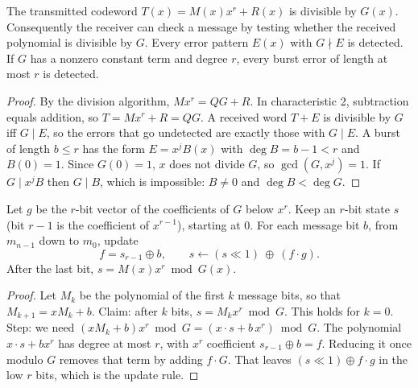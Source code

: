 \begin{theorem}\label{thm:crc}
The transmitted codeword $T(x) = M(x)x^r + R(x)$ is divisible by $G(x)$.
Consequently the receiver can check a message by testing whether the
received polynomial is divisible by $G$. Every error pattern $E(x)$ with
$G \nmid E$ is detected. If $G$ has a nonzero constant term and degree
$r$, every burst error of length at most $r$ is detected.
\end{theorem}
\begin{proof}
By the division algorithm, $M x^r = Q G + R$. In characteristic 2,
subtraction equals addition, so $T = Mx^r + R = QG$. A received word
$T+E$ is divisible by $G$ iff $G\mid E$, so the errors that go undetected
are exactly those with $G \mid E$. A burst of length $b\le r$ has the form
$E = x^j B(x)$ with $\deg B = b-1 < r$ and $B(0)=1$. Since $G(0)=1$, $x$
does not divide $G$, so $\gcd(G, x^j) = 1$. If $G \mid x^jB$ then
$G\mid B$, which is impossible: $B\neq0$ and $\deg B<\deg G$.
\end{proof}

\begin{proposition}\label{prop:lfsr}
Let $g$ be the $r$-bit vector of the coefficients of $G$ below $x^r$. Keep an
$r$-bit state $s$ (bit $r-1$ is the coefficient of $x^{r-1}$), starting at
0. For each message bit $b$, from $m_{n-1}$ down to $m_0$, update
\[
  f = s_{r-1}\oplus b, \qquad s \gets (s \ll 1)\ \oplus\ (f\cdot g).
\]
After the last bit, $s = M(x)x^r \bmod G(x)$.
\end{proposition}
\begin{proof}
Let $M_k$ be the polynomial of the first $k$ message bits, so that
$M_{k+1} = x M_k + b$. Claim: after $k$ bits, $s = M_k x^r \bmod G$. This
holds for $k=0$. Step: we need $(xM_k + b)x^r \bmod G
= (x\cdot s + b\,x^r) \bmod G$. The polynomial $x\cdot s + bx^r$ has degree
at most $r$, with $x^r$ coefficient $s_{r-1}\oplus b = f$. Reducing it once
modulo $G$ removes that term by adding $f\cdot G$. That leaves
$(s\ll1)\oplus f\cdot g$ in the low $r$ bits, which is the update rule.
\end{proof}

